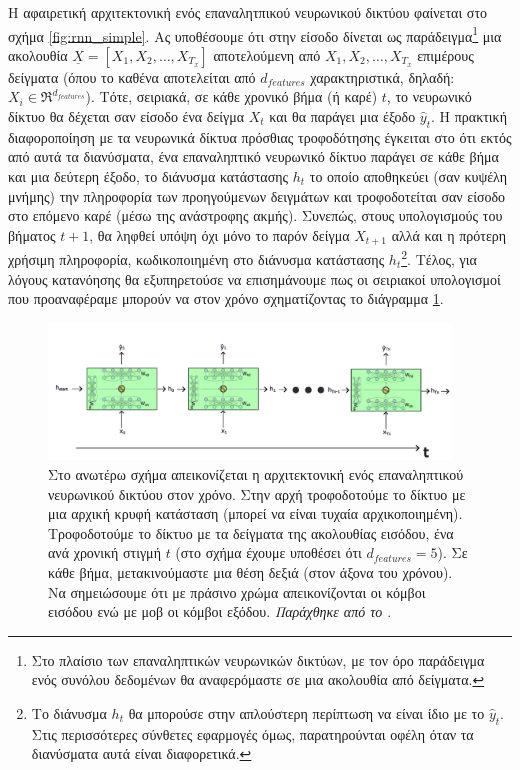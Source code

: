 Η αφαιρετική αρχιτεκτονική ενός επαναλητπικού νευρωνικού δικτύου φαίνεται στο σχήμα \ref{fig:rnn_simple}. Ας υποθέσουμε ότι στην είσοδο δίνεται ως παράδειγμα\footnote{Στο πλαίσιο των επαναληπτικών νευρωνικών δικτύων, με τον όρο παράδειγμα ενός συνόλου δεδομένων θα αναφερόμαστε σε μια ακολουθία από δείγματα.} μια ακολουθία $\underline{X} = [X_1, X_2, \dots, X_{T_x}]$ αποτελούμενη από $X_1, X_2, \dots, X_{T_x}$ επιμέρους δείγματα (όπου το καθένα αποτελείται από $d_{features}$ χαρακτηριστικά, δηλαδή: $X_i \in \Re^{d_{features}}$). Τότε, σειριακά, σε κάθε χρονικό βήμα (ή καρέ) $t$, το νευρωνικό δίκτυο θα δέχεται σαν είσοδο ένα δείγμα $X_t$ και θα παράγει μια έξοδο $\hat{y}_t$. Η πρακτική διαφοροποίηση με τα νευρωνικά δίκτυα πρόσθιας τροφοδότησης έγκειται στο ότι εκτός από αυτά τα διανύσματα, ένα επαναληπτικό νευρωνικό δίκτυο παράγει σε κάθε βήμα και μια δεύτερη έξοδο, το διάνυσμα κατάστασης $h_{t}$ το οποίο αποθηκεύει (σαν κυψέλη μνήμης) την πληροφορία των προηγούμενων δειγμάτων και τροφοδοτείται σαν είσοδο στο επόμενο καρέ (μέσω της ανάστροφης ακμής). Συνεπώς, στους υπολογισμούς του βήματος $t+1$, θα ληφθεί υπόψη όχι μόνο το παρόν δείγμα $X_{t+1}$ αλλά και η πρότερη χρήσιμη πληροφορία, κωδικοποιημένη στο διάνυσμα κατάστασης $h_{t}$\footnote{Το διάνυσμα $h_{t}$ θα μπορούσε στην απλούστερη περίπτωση να είναι ίδιο με το $\hat{y}_{t}$. Στις περισσότερες σύνθετες εφαρμογές όμως, παρατηρούνται οφέλη όταν τα διανύσματα αυτά είναι διαφορετικά.}. Τέλος, για λόγους κατανόησης θα εξυπηρετούσε να επισημάνουμε πως οι σειριακοί υπολογισμοί που προαναφέραμε μπορούν να  στον χρόνο σχηματίζοντας το διάγραμμα \ref{fig:rnn_unrolled}.\par

\begin{figure}[h]
  \centering
  \includegraphics[width=0.95\textwidth]{images/chapter theoritical background/rnn_unroled.pdf}
  \caption{Στο ανωτέρω σχήμα απεικονίζεται η αρχιτεκτονική ενός επαναληπτικού νευρωνικού δικτύου  στον χρόνο. Στην αρχή τροφοδοτούμε το δίκτυο με μια αρχική κρυφή κατάσταση (μπορεί να είναι τυχαία αρχικοποιημένη). Τροφοδοτούμε το δίκτυο με τα δείγματα της ακολουθίας εισόδου, ένα ανά χρονική στιγμή $t$ (στο σχήμα έχουμε υποθέσει ότι $d_{features} = 5$). Σε κάθε βήμα, μετακινούμαστε μια θέση δεξιά (στον άξονα του χρόνου). Να σημειώσουμε ότι με πράσινο χρώμα απεικονίζονται οι κόμβοι εισόδου ενώ με μοβ οι κόμβοι εξόδου. \textit{Παράχθηκε από το \href{https://inkscape.org/}{}}.}
  \label{fig:rnn_unrolled}
\end{figure}


